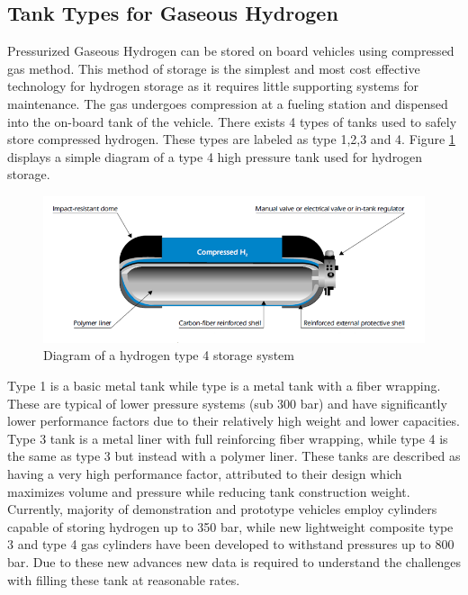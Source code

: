 \documentclass[paper=a4, fontsize=11pt, abstract=on]{scrartcl}
\numberwithin{equation}{section}		%
\numberwithin{figure}{section}			%
\numberwithin{table}{section}				%
\begin{document}
\subsection{Tank Types for Gaseous Hydrogen}
Pressurized Gaseous Hydrogen can be stored on board vehicles using compressed gas method. This method of storage is the simplest and most cost effective technology for hydrogen storage as it requires little supporting systems for maintenance. The gas undergoes compression at a fueling station and dispensed into the on-board tank of the vehicle. There exists 4 types of tanks used to safely store compressed hydrogen. These types are labeled as type 1,2,3 and 4. Figure \ref{tank} displays a simple diagram of a type 4 high pressure tank used for hydrogen storage.


\begin{figure}[H]
\centering
\includegraphics[width=0.8\linewidth]{tank2}
\caption{Diagram of a hydrogen  type 4 storage system}
\label{tank}
\end{figure}

 Type 1 is a basic metal tank while type is a metal tank with a fiber wrapping. These are typical of lower pressure systems (sub 300 bar) and have significantly lower performance factors due to their relatively high weight and lower capacities. Type 3 tank is a metal liner with full reinforcing fiber wrapping, while type 4 is the same as type 3 but instead with a polymer liner. These tanks are described as having a very high performance factor, attributed to their design which maximizes volume and pressure while reducing tank construction weight.  Currently, majority of demonstration and prototype vehicles employ cylinders capable of storing hydrogen up to 350 bar, while new lightweight composite type 3 and type 4 gas cylinders have been developed to withstand pressures up to 800 bar. Due to these new advances new data is required to understand the challenges with filling these tank at reasonable rates.
\end{document}
